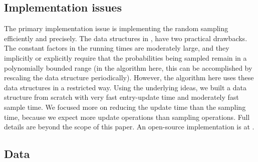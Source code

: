 \documentclass[11pt]{svjour3} \usepackage{fullpage}
\begin{document}
\subsection{Implementation issues}
The primary implementation issue is implementing the random sampling efficiently and precisely.
The data structures in
\cite{matias2003dgd,hagerup1993oag},
have two practical drawbacks.
The constant factors in the running times are moderately large,
and they implicitly or explicitly require that the probabilities being sampled
remain in a polynomially bounded range
(in the algorithm here, this can be accomplished 
by rescaling the data structure periodically).
However, the algorithm here uses these data structures in a restricted way.
Using the underlying ideas,
we built a data structure from scratch with very fast entry-update time
and moderately fast sample time.
We focused more on reducing the update time than the sampling time,
because we expect more update operations than sampling operations.
Full details are beyond the scope of this paper.
An open-source implementation is at \cite{fastpc2013}.

\subsection{Data} 
\end{document}

